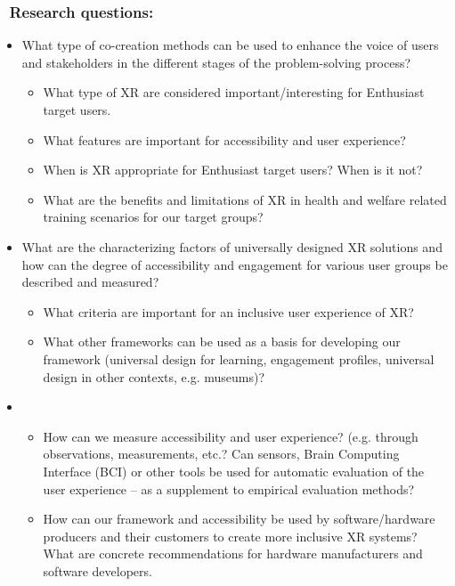 \subsubsection[\ Research questions: ]{\ Research questions: }
\begin{itemize}
\item What type of co-creation methods can be used to enhance the voice of users and stakeholders in the different
stages of the problem-solving process? 

\begin{itemize}
\item What type of XR are considered important/interesting for Enthusiast target users. 
\item What features are important for accessibility and user experience? 
\item When is XR appropriate for Enthusiast target users? When is it not?
\item What are the benefits and limitations of XR in health and welfare related training scenarios for our target
groups?
\end{itemize}
\item What are the characterizing factors of universally designed XR solutions and how can the degree of accessibility
and engagement for various user groups be described and measured? 

\begin{itemize}
\item What criteria are important for an inclusive user experience of XR?
\item What other frameworks can be used as a basis for developing our framework (universal design for learning,
engagement profiles, universal design in other contexts, e.g. museums)?
\end{itemize}
\end{itemize}
\begin{itemize}
\item \begin{itemize}
\item How can we measure accessibility and user experience? (e.g. through observations, measurements, etc.? Can sensors,
Brain Computing Interface (BCI) or other tools be used for automatic evaluation of the user experience – as a
supplement to empirical evaluation methods? \ 
\item How can our framework and accessibility be used by software/hardware producers and their customers to create more
inclusive XR systems? What are concrete recommendations for hardware manufacturers and software developers.
\end{itemize}
\end{itemize}
